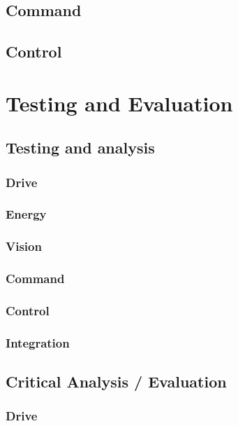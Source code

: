 \documentclass[10pt,twoside]{article}
\begin{document}
\subsection{Command}

\subsection{Control}

\section{Testing and Evaluation}
\subsection{Testing and analysis}

\subsubsection{Drive}

\subsubsection{Energy}

\subsubsection{Vision}

\subsubsection{Command}

\subsubsection{Control}

\subsubsection{Integration}

\subsection{Critical Analysis / Evaluation}

\subsubsection{Drive}
\end{document}
